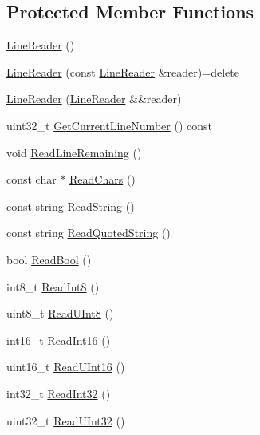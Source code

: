 \subsection*{Protected Member Functions}
\begin{DoxyCompactItemize}
\item 
\hyperlink{classmage_1_1_line_reader_ab4a46321d7ea3ecda2d6390c78a7285b}{Line\+Reader} ()
\item 
\hyperlink{classmage_1_1_line_reader_ae4f871bebae110704b34c0bd88460639}{Line\+Reader} (const \hyperlink{classmage_1_1_line_reader}{Line\+Reader} \&reader)=delete
\item 
\hyperlink{classmage_1_1_line_reader_ad972c7100f726e7b061d864083ba0225}{Line\+Reader} (\hyperlink{classmage_1_1_line_reader}{Line\+Reader} \&\&reader)
\item 
uint32\+\_\+t \hyperlink{classmage_1_1_line_reader_a55f35bf4989ad109524da146639870d6}{Get\+Current\+Line\+Number} () const
\item 
void \hyperlink{classmage_1_1_line_reader_a3a4b99bfef1e8a826d74a01bcc663fcb}{Read\+Line\+Remaining} ()
\item 
const char $\ast$ \hyperlink{classmage_1_1_line_reader_ad915c1a17549c7758c10f0b6db7e5611}{Read\+Chars} ()
\item 
const string \hyperlink{classmage_1_1_line_reader_a58a27b637574ce56ea17a575aa540675}{Read\+String} ()
\item 
const string \hyperlink{classmage_1_1_line_reader_ae9a7547d01b29c3237b198444d4f3aef}{Read\+Quoted\+String} ()
\item 
bool \hyperlink{classmage_1_1_line_reader_a86289c358afe9b3bc5c7789bb8a6af95}{Read\+Bool} ()
\item 
int8\+\_\+t \hyperlink{classmage_1_1_line_reader_a3b88ec3a8555d79b25c2a8818a26f124}{Read\+Int8} ()
\item 
uint8\+\_\+t \hyperlink{classmage_1_1_line_reader_a943ce0074c0861109f8b4ee10df8a221}{Read\+U\+Int8} ()
\item 
int16\+\_\+t \hyperlink{classmage_1_1_line_reader_a5ec3ccfcd1044f6be73c51082d2b57e3}{Read\+Int16} ()
\item 
uint16\+\_\+t \hyperlink{classmage_1_1_line_reader_a89f8d84257eae17db8c1e67d17f839f9}{Read\+U\+Int16} ()
\item 
int32\+\_\+t \hyperlink{classmage_1_1_line_reader_a45c66ad0b4676ef3fb2b5b08f04b509d}{Read\+Int32} ()
\item 
uint32\+\_\+t \hyperlink{classmage_1_1_line_reader_a82d14aede3b4ebff8cc54345dfba2c4b}{Read\+U\+Int32} ()

\end{DoxyCompactItemize}
